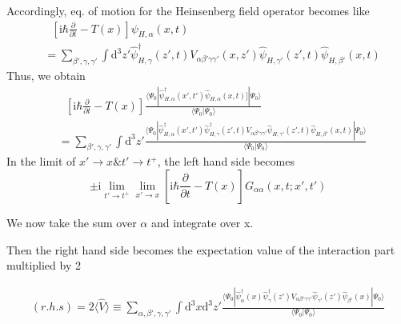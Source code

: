 Accordingly, eq. of motion for the Heinsenberg field operator becomes like 
\begin{align}
&\ \ \ [\mathrm{i}\hbar\frac{\partial}{\partial t}-T(x)]\psi_{H,\alpha}(x,t)\nonumber \\
&=\sum_{\beta',\gamma,\gamma'}\int \mathrm{d}^3z'\hat \psi^{\dagger}_{H,\gamma}(z',t)V_{\alpha\beta'\gamma\gamma'}(x,z')\hat \psi_{H,\gamma'}(z',t)\hat \psi_{H,\beta'}(x,t) \nonumber
\end{align}
Thus, we obtain 
\begin{align}\label{2.3.4}
&\ \ \ [\mathrm{i}\hbar\frac{\partial}{\partial t}-T(x)]\frac{\langle\Psi_0|\hat \psi^{
\dagger}_{H,\alpha}(x',t')\hat \psi_{H,\alpha} (x,t)]|\Psi_0\rangle}{\langle\Psi_0|\Psi_0\rangle}\nonumber \\
&=\sum_{\beta',\gamma,\gamma'}\int \mathrm{d}^3z'\frac{\langle\Psi_0|
\hat \psi^{\dagger}_{H,\alpha}(x',t')\hat \psi^{\dagger}_{H,\gamma}(z',t)V_{\alpha\beta'\gamma\gamma'}\hat\psi_{H,\gamma'}(z',t)\hat\psi_{H,\beta'}(x,t)
|\Psi_0\rangle}{\langle\Psi_0|\Psi_0\rangle} 
\end{align}
In the limit of $x' \rightarrow x \& t' \rightarrow t^+$, the left hand side becomes
\begin{equation}
\pm \mathrm{i} \lim_{t' \rightarrow t^+} \lim_{x' \rightarrow x} [\mathrm{i}\hbar\frac{\partial}{\partial t}-T(x)] G_{\alpha\alpha}(x,t;x',t') \nonumber
\end{equation}

We now take the sum over $\alpha$ and integrate over x.

Then the right hand side becomes the expectation value of the interaction part multiplied by 2

\begin{align}
(r.h.s)=2\langle\hat V\rangle \equiv \sum_{\alpha,\beta',\gamma,\gamma'}\int \mathrm{d}^3x\mathrm{d}^3z'\frac{\langle\Psi_0|
\hat \psi^{\dagger}_{\alpha}(x)\hat \psi^{\dagger}_{\gamma}(z')V_{\alpha\beta'\gamma\gamma'}\hat\psi_{\gamma'}(z')\hat\psi_{\beta'}(x)
|\Psi_0\rangle}{\langle\Psi_0|\Psi_0\rangle} \nonumber
\end{align}

